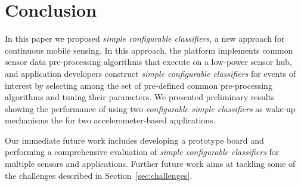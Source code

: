 \section{Conclusion}
\label{sec:conclusion}

In this paper we proposed {\em simple configurable classifiers}, a new
approach for continuous mobile sensing.  In this approach, the platform implements
common sensor data pre-processing algorithms that execute on a low-power sensor hub, and
application developers construct {\em simple configurable classifiers}
for events of interest by selecting among the set of pre-defined
common pre-processing algorithms and tuning their parameters.  We presented
preliminary results showing the performance of using two {\em configurable 
simple classifiers} as wake-up mechanisms the for two accelerometer-based applications.

Our immediate future work includes developing a prototype board and 
performing a comprehensive evaluation of {\em simple configurable 
classifiers} for multiple sensors and applications. Further future work 
aims at tackling some of the challenges described in Section~\ref{sec:challenges}.  
